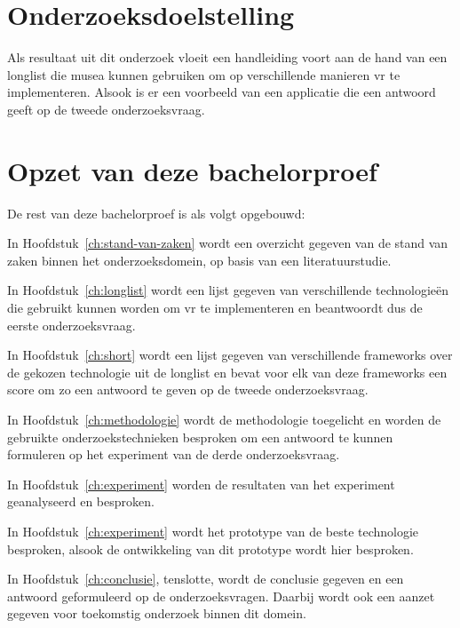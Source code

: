 \section{Onderzoeksdoelstelling}
\label{sec:onderzoeksdoelstelling}

Als resultaat uit dit onderzoek vloeit een handleiding voort aan de hand van een longlist die musea kunnen gebruiken om op verschillende manieren \acrshort{vr} te implementeren. Alsook is er een voorbeeld van een applicatie die een antwoord geeft op de tweede onderzoeksvraag.

\section{Opzet van deze bachelorproef}
\label{sec:opzet-bachelorproef}


De rest van deze bachelorproef is als volgt opgebouwd:

In Hoofdstuk~\ref{ch:stand-van-zaken} wordt een overzicht gegeven van de stand van zaken binnen het onderzoeksdomein, op basis van een literatuurstudie.

In Hoofdstuk~\ref{ch:longlist} wordt een lijst gegeven van verschillende technologieën die gebruikt kunnen worden om \acrshort{vr} te implementeren en beantwoordt dus de eerste onderzoeksvraag.

In Hoofdstuk~\ref{ch:short} wordt een lijst gegeven van verschillende frameworks over de gekozen technologie uit de longlist en bevat voor elk van deze frameworks een score om zo een antwoord te geven op de tweede onderzoeksvraag.

In Hoofdstuk~\ref{ch:methodologie} wordt de methodologie toegelicht en worden de gebruikte onderzoekstechnieken besproken om een antwoord te kunnen formuleren op het experiment van de derde onderzoeksvraag.

In Hoofdstuk~\ref{ch:experiment} worden de resultaten van het experiment geanalyseerd en besproken.

In Hoofdstuk~\ref{ch:experiment} wordt het prototype van de beste technologie besproken, alsook de ontwikkeling van dit prototype wordt hier besproken.

In Hoofdstuk~\ref{ch:conclusie}, tenslotte, wordt de conclusie gegeven en een antwoord geformuleerd op de onderzoeksvragen. Daarbij wordt ook een aanzet gegeven voor toekomstig onderzoek binnen dit domein.

